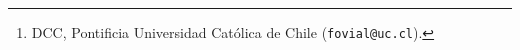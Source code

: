 


\author{Francisco Jos\'e Vial Prado \thanks{DCC,  Pontificia
Universidad Cat\'olica de Chile (\texttt{fovial@uc.cl}).}}
\date{}
%
%

